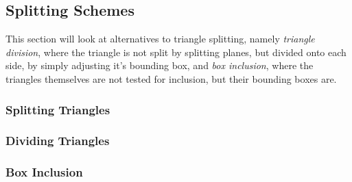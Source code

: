 


\subsection{Splitting Schemes}\label{sec:splittingGeom}

This section will look at alternatives to triangle splitting, namely
\textit{triangle division}, where the triangle is not split by
splitting planes, but divided onto each side, by simply adjusting it's
bounding box, and \textit{box inclusion}, where the triangles
themselves are not tested for inclusion, but their bounding boxes are.




\subsubsection{Splitting Triangles}


\subsubsection{Dividing Triangles}




\subsubsection{Box Inclusion}





